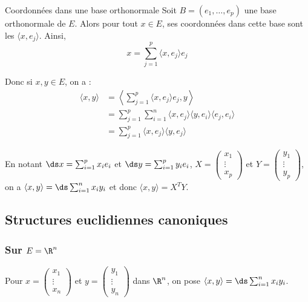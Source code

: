\begin{proposition}{Coordonnées dans une base orthonormale}{}
    Soit $B = (e_1, \dots, e_p)$ une base orthonormale de $E$. Alors pour tout 
    $x \in E$, ses coordonnées dans cette base sont les $\langle x, e_j \rangle$. 
    Ainsi, 
    $$x = \sum_{j = 1}^p \langle x, e_j \rangle e_j$$    
\end{proposition}

Donc si $x, y \in E$, on a : 
\begin{align}
    \langle x, y \rangle & = \left\langle \sum_{j = 1}^p \langle x, e_j \rangle e_j, y \right\rangle \\
    & = \sum_{j = 1}^p \sum_{i = 1}^{n } \langle x, e_j \rangle \langle y, e_i \rangle \langle e_j, e_i \rangle \\
    & = \sum_{j = 1}^p \langle x, e_j \rangle \langle y, e_j \rangle
\end{align}

En notant $\ds x = \sum_{i = 1}^{p } x_i e_i$ et $\ds y = \sum_{i = 1}^{p } y_i e_i$, 
$X = \begin{pmatrix}
x_1 \\ \vdots \\ x_p
\end{pmatrix}$ et $Y = \begin{pmatrix}y_1 \\ \vdots \\ y_p
\end{pmatrix}$, on a $\langle x, y \rangle = \ds \sum_{i = 1}^{n } x_i y_i$ et donc $\langle x, y \rangle = X^T Y$.


\subsection{Structures euclidiennes canoniques }
\subsubsection{Sur \texorpdfstring{$E = \R^n$}{E = Rn}}

Pour $x = \begin{pmatrix}
x_1 \\ \vdots \\ x_n
\end{pmatrix}$ et $y = \begin{pmatrix}y_1 \\ \vdots \\ y_n
\end{pmatrix}$ dans $\R^n$, on pose $\langle x, y \rangle = \ds \sum_{i=1}^{n} x_i y_i$.

